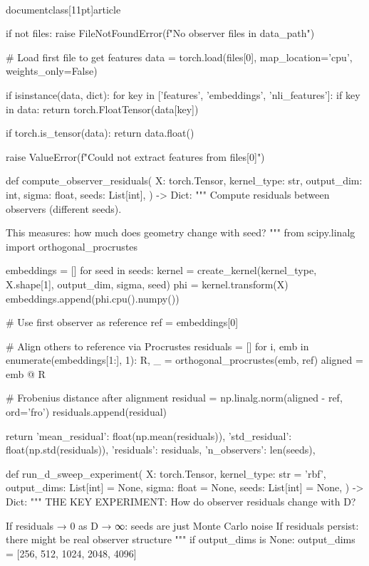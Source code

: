 \\documentclass[11pt]{article}
\begin{document}
\begin{CodeBlock}
    if not files:
        raise FileNotFoundError(f"No observer files in {data_path}")
    
    # Load first file to get features
    data = torch.load(files[0], map_location='cpu', weights_only=False)
    
    if isinstance(data, dict):
        for key in ['features', 'embeddings', 'nli_features']:
            if key in data:
                return torch.FloatTensor(data[key])
    
    if torch.is_tensor(data):
        return data.float()
    
    raise ValueError(f"Could not extract features from {files[0]}")


def compute_observer_residuals(
    X: torch.Tensor,
    kernel_type: str,
    output_dim: int,
    sigma: float,
    seeds: List[int],
) -> Dict:
    """
    Compute residuals between observers (different seeds).
    
    This measures: how much does geometry change with seed?
    """
    from scipy.linalg import orthogonal_procrustes
    
    embeddings = []
    for seed in seeds:
        kernel = create_kernel(kernel_type, X.shape[1], output_dim, sigma, seed)
        phi = kernel.transform(X)
        embeddings.append(phi.cpu().numpy())
    
    # Use first observer as reference
    ref = embeddings[0]
    
    # Align others to reference via Procrustes
    residuals = []
    for i, emb in enumerate(embeddings[1:], 1):
        R, _ = orthogonal_procrustes(emb, ref)
        aligned = emb @ R
        
        # Frobenius distance after alignment
        residual = np.linalg.norm(aligned - ref, ord='fro')
        residuals.append(residual)
    
    return {
        'mean_residual': float(np.mean(residuals)),
        'std_residual': float(np.std(residuals)),
        'residuals': residuals,
        'n_observers': len(seeds),
    }


def run_d_sweep_experiment(
    X: torch.Tensor,
    kernel_type: str = 'rbf',
    output_dims: List[int] = None,
    sigma: float = None,
    seeds: List[int] = None,
) -> Dict:
    """
    THE KEY EXPERIMENT: How do observer residuals change with D?
    
    If residuals → 0 as D → ∞: seeds are just Monte Carlo noise
    If residuals persist: there might be real observer structure
    """
    if output_dims is None:
        output_dims = [256, 512, 1024, 2048, 4096]
    

\end{CodeBlock}
\end{document}
